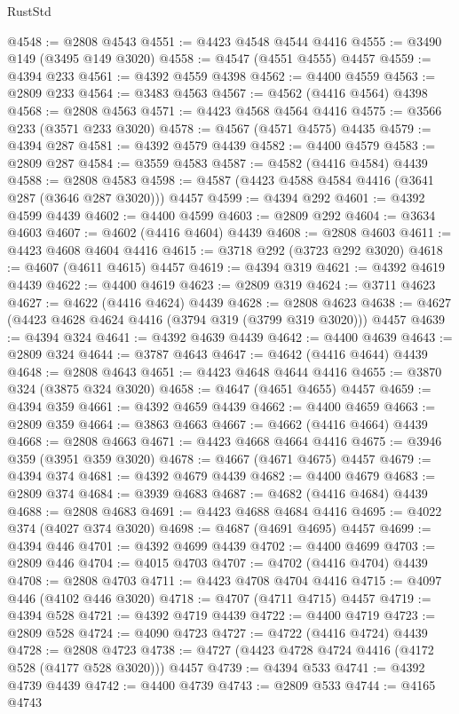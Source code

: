 \begin{lexlean}{RustStd}
\begin{coremodule}
@4548 := @2808 @4543
@4551 := @4423 @4548 @4544 @4416
@4555 := @3490 @149 (@3495 @149 @3020)
@4558 := @4547 (@4551 @4555) @4457
@4559 := @4394 @233
@4561 := @4392 @4559 @4398
@4562 := @4400 @4559
@4563 := @2809 @233
@4564 := @3483 @4563
@4567 := @4562 (@4416 @4564) @4398
@4568 := @2808 @4563
@4571 := @4423 @4568 @4564 @4416
@4575 := @3566 @233 (@3571 @233 @3020)
@4578 := @4567 (@4571 @4575) @4435
@4579 := @4394 @287
@4581 := @4392 @4579 @4439
@4582 := @4400 @4579
@4583 := @2809 @287
@4584 := @3559 @4583
@4587 := @4582 (@4416 @4584) @4439
@4588 := @2808 @4583
@4598 := @4587 (@4423 @4588 @4584 @4416 (@3641 @287 (@3646 @287 @3020))) @4457
@4599 := @4394 @292
@4601 := @4392 @4599 @4439
@4602 := @4400 @4599
@4603 := @2809 @292
@4604 := @3634 @4603
@4607 := @4602 (@4416 @4604) @4439
@4608 := @2808 @4603
@4611 := @4423 @4608 @4604 @4416
@4615 := @3718 @292 (@3723 @292 @3020)
@4618 := @4607 (@4611 @4615) @4457
@4619 := @4394 @319
@4621 := @4392 @4619 @4439
@4622 := @4400 @4619
@4623 := @2809 @319
@4624 := @3711 @4623
@4627 := @4622 (@4416 @4624) @4439
@4628 := @2808 @4623
@4638 := @4627 (@4423 @4628 @4624 @4416 (@3794 @319 (@3799 @319 @3020))) @4457
@4639 := @4394 @324
@4641 := @4392 @4639 @4439
@4642 := @4400 @4639
@4643 := @2809 @324
@4644 := @3787 @4643
@4647 := @4642 (@4416 @4644) @4439
@4648 := @2808 @4643
@4651 := @4423 @4648 @4644 @4416
@4655 := @3870 @324 (@3875 @324 @3020)
@4658 := @4647 (@4651 @4655) @4457
@4659 := @4394 @359
@4661 := @4392 @4659 @4439
@4662 := @4400 @4659
@4663 := @2809 @359
@4664 := @3863 @4663
@4667 := @4662 (@4416 @4664) @4439
@4668 := @2808 @4663
@4671 := @4423 @4668 @4664 @4416
@4675 := @3946 @359 (@3951 @359 @3020)
@4678 := @4667 (@4671 @4675) @4457
@4679 := @4394 @374
@4681 := @4392 @4679 @4439
@4682 := @4400 @4679
@4683 := @2809 @374
@4684 := @3939 @4683
@4687 := @4682 (@4416 @4684) @4439
@4688 := @2808 @4683
@4691 := @4423 @4688 @4684 @4416
@4695 := @4022 @374 (@4027 @374 @3020)
@4698 := @4687 (@4691 @4695) @4457
@4699 := @4394 @446
@4701 := @4392 @4699 @4439
@4702 := @4400 @4699
@4703 := @2809 @446
@4704 := @4015 @4703
@4707 := @4702 (@4416 @4704) @4439
@4708 := @2808 @4703
@4711 := @4423 @4708 @4704 @4416
@4715 := @4097 @446 (@4102 @446 @3020)
@4718 := @4707 (@4711 @4715) @4457
@4719 := @4394 @528
@4721 := @4392 @4719 @4439
@4722 := @4400 @4719
@4723 := @2809 @528
@4724 := @4090 @4723
@4727 := @4722 (@4416 @4724) @4439
@4728 := @2808 @4723
@4738 := @4727 (@4423 @4728 @4724 @4416 (@4172 @528 (@4177 @528 @3020))) @4457
@4739 := @4394 @533
@4741 := @4392 @4739 @4439
@4742 := @4400 @4739
@4743 := @2809 @533
@4744 := @4165 @4743

\end{coremodule}
\end{lexlean}
